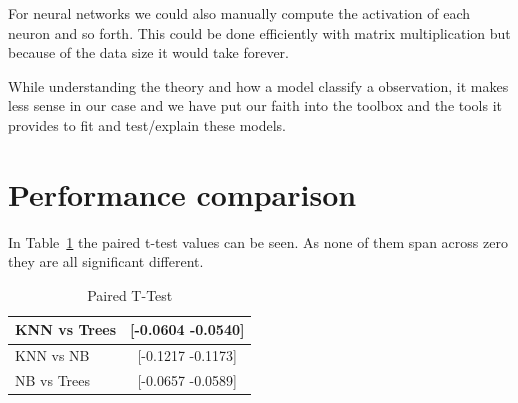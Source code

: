 For neural networks we could also manually compute the activation of each neuron and so forth. This could be done efficiently with matrix multiplication but because of the data size it would take forever. 

While understanding the theory and how a model classify a observation, it makes less sense in our case and we have put our faith into the toolbox and the tools it provides to fit and test/explain these models. 

\section{Performance comparison}
In Table~\ref{tab:ttest} the paired t-test values can be seen. As none of them span across zero they are all significant different.
\begin{table}[h]
\centering
\begin{tabular}{|l|c|}
\hline
KNN vs Trees & [-0.0604   -0.0540] \\ \hline
KNN vs NB	 & [-0.1217   -0.1173]\\ \hline   %
NB vs Trees  & [-0.0657   -0.0589] \\ \hline					%
\end{tabular}\\
\caption{Paired T-Test\label{tab:ttest}}
\end{table}